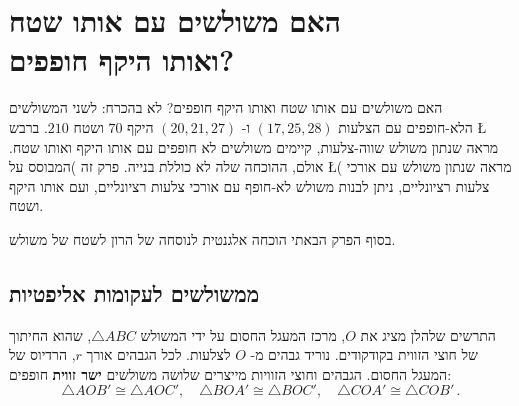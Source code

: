
\chapter[\R{האם משולשים עם אותו שטח ואותו היקף חופפים?}]{האם משולשים עם אותו שטח\\
ואותו היקף חופפים?}

האם משולשים עם אותו שטח ואותו היקף חופפים? לא בהכרח: לשני המשולשים הלא-חופפים עם הצלעות
$(17,25,28)$
ו-%
$(20,21,27)$
היקף
$70$
ושטח 
$210$.
ברבש
\L{\cite{marita}}
מראה שנתון משולש שווה-צלעות, קיימים משולשים לא חופפים עם אותו היקף ואותו שטח. אולם, ההוכחה שלה לא כוללת בנייה. פרק זה )המבוסס על 
\L{\cite{heron}}(
מראה שנתון משולש עם אורכי צלעות רציונליים, ניתן לבנות משולש לא-חופף עם אורכי צלעות רציונליים, ועם אותו היקף ושטח.

בסוף הפרק הבאתי הוכחה אלגנטית לנוסחה של הרון לשטח של משולש.


\section{%
ממשולשים לעקומות אליפטיות%
}

התרשים שלהלן מציג את 
$O$, 
מרכז המעגל החסום על ידי המשולש
$\triangle ABC$, 
שהוא החיתוך של חוצי הזווית בקודקודים. נוריד גבהים מ-%
$O$
לצלעות. לכל הגבהים אורך
$r$,
הרדיוס של המעגל החסום. הגבהים וחוצי הזוויות מייצרים שלושה משולשים
\textbf{ישר זווית}
חופפים:
\[
\triangle AOB'\cong \triangle AOC',\quad \triangle BOA'\cong \triangle BOC', \quad \triangle COA'\cong \triangle COB'\,.
\]

\vspace{-12ex}

